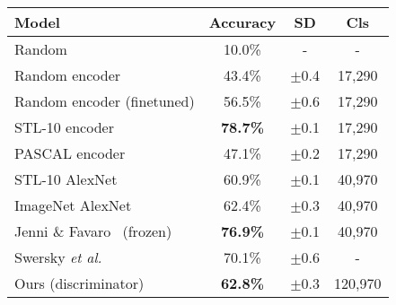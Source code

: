 \documentclass[a4paper,12pt]{report}
\begin{document}
\begin{table}[ht!]
\centering
\begin{tabular}{l c c|c}
\Xhline{0.8pt}
\textbf{Model} & \textbf{Accuracy} & \textbf{SD} & \textbf{Cls}\\
\hline
Random & 10.0\% & - & - \\
Random encoder & 43.4\% & $\pm$0.4 & 17,290 \\ %
Random encoder (finetuned) & 56.5\% & $\pm$0.6 & 17,290 \\ %
\hline
STL-10 encoder & \textbf{78.7\%} & $\pm$0.1 & 17,290 \\ %
PASCAL encoder & 47.1\% & $\pm$0.2 & 17,290 \\ %
STL-10 AlexNet & 60.9\% & $\pm$0.1 & 40,970 \\ %
ImageNet AlexNet & 62.4\% & $\pm$0.3 & 40,970 \\ %
\hline
Jenni \& Favaro~\cite{SpotArtifacts} (frozen) & \textbf{76.9\%} & $\pm$0.1 & 40,970 \\
Swersky \textit{et al.}~\cite{StL10TlExp2Comp} & 70.1\% & $\pm$0.6 & - \\
\hline
Ours (discriminator) & \textbf{62.8\%}  & $\pm$0.3 & 120,970 \\ %

\end{tabular}
\end{table}
\end{document}
